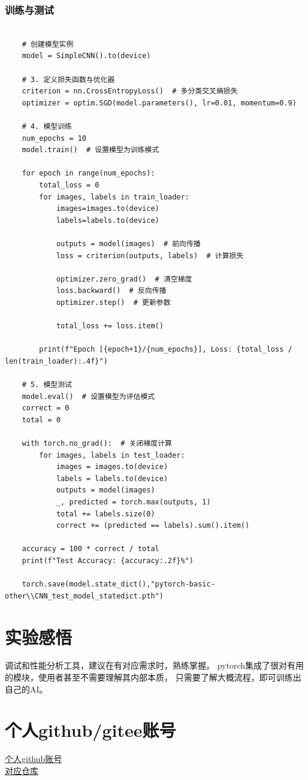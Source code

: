 \documentclass[UTF8]{ctexart}
\begin{document}
\subsubsection{训练与测试}
\begin{verbatim}
		
	# 创建模型实例
	model = SimpleCNN().to(device)

	# 3. 定义损失函数与优化器
	criterion = nn.CrossEntropyLoss()  # 多分类交叉熵损失
	optimizer = optim.SGD(model.parameters(), lr=0.01, momentum=0.9)

	# 4. 模型训练
	num_epochs = 10
	model.train()  # 设置模型为训练模式

	for epoch in range(num_epochs):
		total_loss = 0
		for images, labels in train_loader:
			images=images.to(device)
			labels=labels.to(device)

			outputs = model(images)  # 前向传播
			loss = criterion(outputs, labels)  # 计算损失

			optimizer.zero_grad()  # 清空梯度
			loss.backward()  # 反向传播
			optimizer.step()  # 更新参数

			total_loss += loss.item()

		print(f"Epoch [{epoch+1}/{num_epochs}], Loss: {total_loss / len(train_loader):.4f}")

	# 5. 模型测试
	model.eval()  # 设置模型为评估模式
	correct = 0
	total = 0

	with torch.no_grad():  # 关闭梯度计算
		for images, labels in test_loader:
			images = images.to(device)
			labels = labels.to(device)
			outputs = model(images)
			_, predicted = torch.max(outputs, 1)
			total += labels.size(0)
			correct += (predicted == labels).sum().item()

	accuracy = 100 * correct / total
	print(f"Test Accuracy: {accuracy:.2f}%")

	torch.save(model.state_dict(),"pytorch-basic-other\\CNN_test_model_statedict.pth")
\end{verbatim}


\section{实验感悟}
调试和性能分析工具，建议在有对应需求时，熟练掌握。
pytorch集成了很对有用的模块，使用者甚至不需要理解其内部本质，
只需要了解大概流程，即可训练出自己的AI。


\section{个人github/gitee账号}
\href{https://github.com/sufwis}{个人github账号}\\
\indent \href{https://github.com/sufwis/development-tools-learn.git}{对应仓库}
\end{document}
